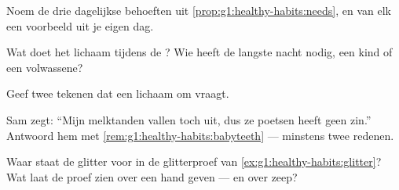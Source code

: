 \begin{exercise}[$\star$]\label{exo:g1:healthy-habits:6}
Noem de drie dagelijkse behoeften uit \cref{prop:g1:healthy-habits:needs},
en van elk een voorbeeld uit je eigen dag.
\end{exercise}

\begin{exercise}[$\star$]\label{exo:g1:healthy-habits:7}
Wat doet het lichaam tijdens de ? Wie heeft de langste nacht
nodig, een kind of een volwassene?
\end{exercise}

\begin{exercise}[$\star$]\label{exo:g1:healthy-habits:8}
Geef twee tekenen dat een lichaam om  vraagt.
\end{exercise}

\begin{exercise}[$\star\star$]\label{exo:g1:healthy-habits:9}
Sam zegt: ``Mijn melktanden vallen toch uit, dus ze poetsen heeft geen
zin.'' Antwoord hem met \cref{rem:g1:healthy-habits:babyteeth} ---
minstens twee redenen.
\end{exercise}

\begin{exercise}[$\star\star$]\label{exo:g1:healthy-habits:10}
Waar staat de glitter voor in de glitterproef van
\cref{ex:g1:healthy-habits:glitter}? Wat laat de proef zien over een
hand geven --- en over zeep?
\end{exercise}
